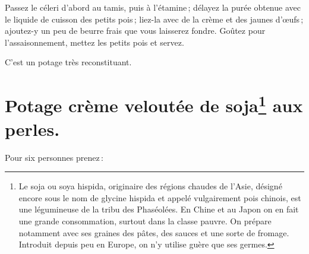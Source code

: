 Passez le céleri d’abord au tamis, puis à l’étamine ; délayez la purée obtenue
avec le liquide de cuisson des petits pois ; liez-la avec de la crème et des
jaunes d'œufs ; ajoutez-y un peu de beurre frais que vous laisserez fondre.
Goûtez pour l'assaisonnement, mettez les petits pois et servez.

C'est un potage très reconstituant.

\section*{\centering Potage crème veloutée de soja\footnote{Le soja ou soya hispida, 
                                                    originaire des régions chaudes de 
                                                    l'Asie, désigné encore sous le nom 
                                                    de glycine hispida et appelé vulgairement 
                                                    pois chinois, est une légumineuse de la 
                                                    tribu des Phaséolées. En Chine et au
                                                    Japon on en fait une grande consommation,
                                                    surtout dans la classe pauvre. On prépare 
                                                    notamment avec ses graines des pâtes, des 
                                                    sauces et une sorte de fromage. Introduit 
                                                    depuis peu en Europe, on n'y utilise guère 
                                                    que ses germes.} aux perles.}


Pour six personnes prenez :

\medskip

